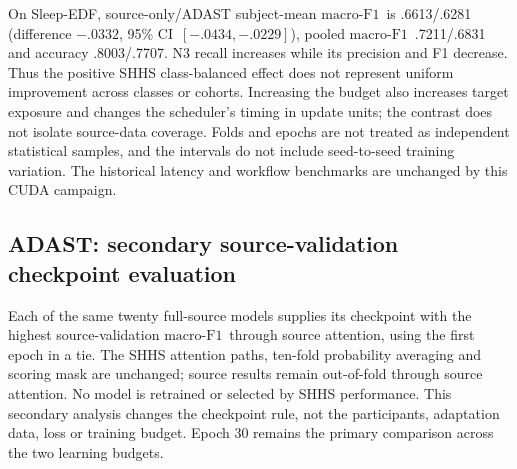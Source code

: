 \documentclass[10pt,a4paper]{article}
\newcommand{\mf}{\ensuremath{\mathrm{macro\text{-}F1}}}
\newcommand{\ci}{95\% CI}
\begin{document}
On Sleep-EDF, source-only/ADAST subject-mean \mf\ is .6613/.6281 (difference
$-.0332$, \ci\ $[-.0434,-.0229]$), pooled \mf\ .7211/.6831 and accuracy
.8003/.7707. N3 recall increases while its precision and F1 decrease. Thus the
positive SHHS class-balanced effect does not represent uniform improvement across
classes or cohorts. Increasing the budget also increases target exposure and changes
the scheduler's timing in update units; the contrast does not isolate source-data
coverage. Folds and epochs are not treated as independent statistical samples, and
the intervals do not include seed-to-seed training variation. The historical latency
and workflow benchmarks are unchanged by this CUDA campaign.

\subsection*{ADAST: secondary source-validation checkpoint evaluation}

Each of the same twenty full-source models supplies its checkpoint with the highest
source-validation \mf\ through source attention, using the first epoch in a tie.
The SHHS attention paths, ten-fold probability averaging and scoring mask are unchanged;
source results remain out-of-fold through source attention. No model is retrained or
selected by SHHS performance. This secondary analysis changes the checkpoint rule,
not the participants, adaptation data, loss or training budget. Epoch 30 remains the
primary comparison across the two learning budgets.
\end{document}
